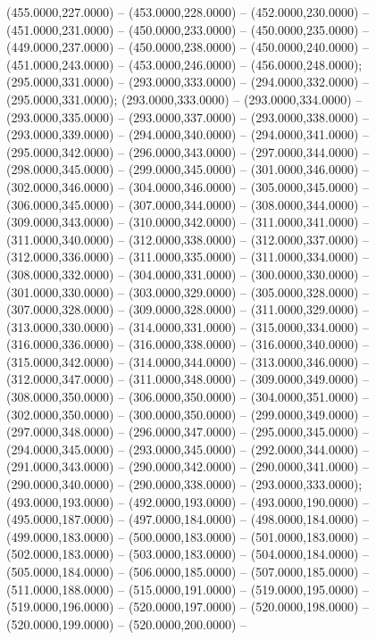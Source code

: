 \begin{scope}[draw=black,fill=cfdae61,line join=round,line width=0.208pt]
    (455.0000,227.0000) -- (453.0000,228.0000) -- (452.0000,230.0000) --
    (451.0000,231.0000) -- (450.0000,233.0000) -- (450.0000,235.0000) --
    (449.0000,237.0000) -- (450.0000,238.0000) -- (450.0000,240.0000) --
    (451.0000,243.0000) -- (453.0000,246.0000) -- (456.0000,248.0000);
   (295.0000,331.0000) -- (293.0000,333.0000) --
    (294.0000,332.0000) -- (295.0000,331.0000);
   (293.0000,333.0000) -- (293.0000,334.0000) --
    (293.0000,335.0000) -- (293.0000,337.0000) -- (293.0000,338.0000) --
    (293.0000,339.0000) -- (294.0000,340.0000) -- (294.0000,341.0000) --
    (295.0000,342.0000) -- (296.0000,343.0000) -- (297.0000,344.0000) --
    (298.0000,345.0000) -- (299.0000,345.0000) -- (301.0000,346.0000) --
    (302.0000,346.0000) -- (304.0000,346.0000) -- (305.0000,345.0000) --
    (306.0000,345.0000) -- (307.0000,344.0000) -- (308.0000,344.0000) --
    (309.0000,343.0000) -- (310.0000,342.0000) -- (311.0000,341.0000) --
    (311.0000,340.0000) -- (312.0000,338.0000) -- (312.0000,337.0000) --
    (312.0000,336.0000) -- (311.0000,335.0000) -- (311.0000,334.0000) --
    (308.0000,332.0000) -- (304.0000,331.0000) -- (300.0000,330.0000) --
    (301.0000,330.0000) -- (303.0000,329.0000) -- (305.0000,328.0000) --
    (307.0000,328.0000) -- (309.0000,328.0000) -- (311.0000,329.0000) --
    (313.0000,330.0000) -- (314.0000,331.0000) -- (315.0000,334.0000) --
    (316.0000,336.0000) -- (316.0000,338.0000) -- (316.0000,340.0000) --
    (315.0000,342.0000) -- (314.0000,344.0000) -- (313.0000,346.0000) --
    (312.0000,347.0000) -- (311.0000,348.0000) -- (309.0000,349.0000) --
    (308.0000,350.0000) -- (306.0000,350.0000) -- (304.0000,351.0000) --
    (302.0000,350.0000) -- (300.0000,350.0000) -- (299.0000,349.0000) --
    (297.0000,348.0000) -- (296.0000,347.0000) -- (295.0000,345.0000) --
    (294.0000,345.0000) -- (293.0000,345.0000) -- (292.0000,344.0000) --
    (291.0000,343.0000) -- (290.0000,342.0000) -- (290.0000,341.0000) --
    (290.0000,340.0000) -- (290.0000,338.0000) -- (293.0000,333.0000);
   (493.0000,193.0000) -- (492.0000,193.0000) --
    (493.0000,190.0000) -- (495.0000,187.0000) -- (497.0000,184.0000) --
    (498.0000,184.0000) -- (499.0000,183.0000) -- (500.0000,183.0000) --
    (501.0000,183.0000) -- (502.0000,183.0000) -- (503.0000,183.0000) --
    (504.0000,184.0000) -- (505.0000,184.0000) -- (506.0000,185.0000) --
    (507.0000,185.0000) -- (511.0000,188.0000) -- (515.0000,191.0000) --
    (519.0000,195.0000) -- (519.0000,196.0000) -- (520.0000,197.0000) --
    (520.0000,198.0000) -- (520.0000,199.0000) -- (520.0000,200.0000) --

\end{scope}
